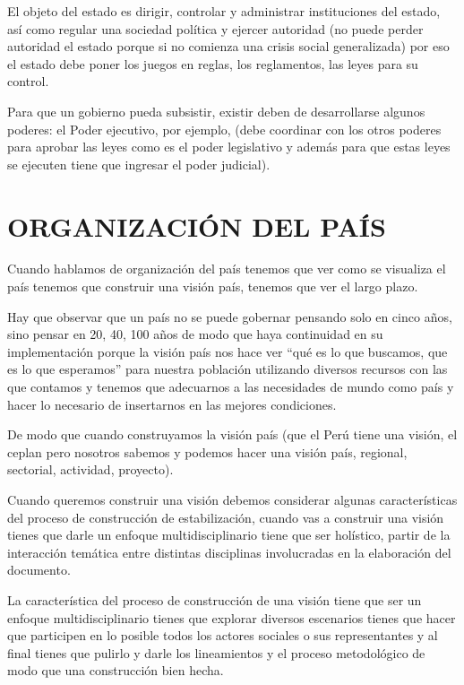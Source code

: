 \documentclass[
  a4paper,
]{article}
\begin{document}
El objeto del estado es dirigir, controlar y administrar instituciones
del estado, así como regular una sociedad política y ejercer autoridad
(no puede perder autoridad el estado porque si no comienza una crisis
social generalizada) por eso el estado debe poner los juegos en reglas,
los reglamentos, las leyes para su control.

Para que un gobierno pueda subsistir, existir deben de desarrollarse
algunos poderes: el Poder ejecutivo, por ejemplo, (debe coordinar con
los otros poderes para aprobar las leyes como es el poder legislativo y
además para que estas leyes se ejecuten tiene que ingresar el poder
judicial).

\hypertarget{organizaciuxf3n-del-pauxeds}{%
\section{ORGANIZACIÓN DEL PAÍS}\label{organizaciuxf3n-del-pauxeds}}

Cuando hablamos de organización del país tenemos que ver como se
visualiza el país tenemos que construir una visión país, tenemos que ver
el largo plazo.

Hay que observar que un país no se puede gobernar pensando solo en cinco
años, sino pensar en 20, 40, 100 años de modo que haya continuidad en su
implementación porque la visión país nos hace ver ``qué es lo que
buscamos, que es lo que esperamos'' para nuestra población utilizando
diversos recursos con las que contamos y tenemos que adecuarnos a las
necesidades de mundo como país y hacer lo necesario de insertarnos en
las mejores condiciones.

De modo que cuando construyamos la visión país (que el Perú tiene una
visión, el ceplan pero nosotros sabemos y podemos hacer una visión país,
regional, sectorial, actividad, proyecto).

Cuando queremos construir una visión debemos considerar algunas
características del proceso de construcción de estabilización, cuando
vas a construir una visión tienes que darle un enfoque
multidisciplinario tiene que ser holístico, partir de la interacción
temática entre distintas disciplinas involucradas en la elaboración del
documento.

La característica del proceso de construcción de una visión tiene que
ser un enfoque multidisciplinario tienes que explorar diversos
escenarios tienes que hacer que participen en lo posible todos los
actores sociales o sus representantes y al final tienes que pulirlo y
darle los lineamientos y el proceso metodológico de modo que una
construcción bien hecha.
\end{document}

